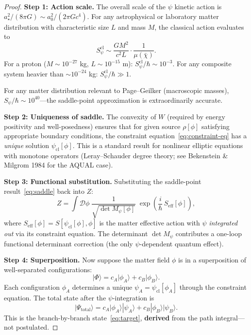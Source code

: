 \documentclass[11pt,a4paper]{article}
\begin{document}
\begin{proof}
\textbf{Step 1: Action scale.}
The overall scale of the $\psi$ kinetic action is
$a_\star^2/(8\pi G) \sim a_0^2/(2\pi G c^4)$. For any astrophysical
or laboratory matter distribution with characteristic size $L$ and mass
$M$, the classical action evaluates to
\begin{equation}
S_\psi^\mathrm{cl} \sim \frac{G M^2}{c^2 L} \cdot \frac{1}{\mu(\bar\chi)}.
\end{equation}
For a proton ($M \sim 10^{-27}$ kg, $L \sim 10^{-15}$ m):
$S_\psi^\mathrm{cl}/\hbar \sim 10^{-3}$. For any composite system
heavier than $\sim 10^{-24}$ kg: $S_\psi^\mathrm{cl}/\hbar \gg 1$.

For any matter distribution relevant to Page--Geilker (macroscopic masses),
$S_\psi/\hbar \sim 10^{40}$---the saddle-point approximation is
extraordinarily accurate.

\textbf{Step 2: Uniqueness of saddle.}
The convexity of $W$ (required by energy positivity and well-posedness)
ensures that for given source $\rho[\phi]$ satisfying appropriate boundary
conditions, the constraint equation~\eqref{eq:constraint-eq} has a
\emph{unique} solution $\psi_\mathrm{cl}[\phi]$. This is a standard
result for nonlinear elliptic equations with monotone operators
(Leray--Schauder degree theory; see Bekenstein \& Milgrom 1984 for the
AQUAL case).

\textbf{Step 3: Functional substitution.}
Substituting the saddle-point result~\eqref{eq:saddle} back into
$Z$:
\begin{equation}
Z = \int\mathcal{D}\phi\;
\frac{1}{\sqrt{\det M_\psi[\phi]}}\;
\exp\!\left(\frac{i}{\hbar}\,S_\mathrm{eff}[\phi]\right),
\end{equation}
where $S_\mathrm{eff}[\phi] = S[\psi_\mathrm{cl}[\phi],\phi]$ is the
matter effective action with $\psi$ \emph{integrated out} via its constraint
equation. The determinant $\det M_\psi$ contributes a one-loop functional
determinant correction (the only $\psi$-dependent quantum effect).

\textbf{Step 4: Superposition.}
Now suppose the matter field $\phi$ is in a superposition of
well-separated configurations:
\begin{equation}
|\Phi\rangle = c_A|\phi_A\rangle + c_B|\phi_B\rangle.
\end{equation}
Each configuration $\phi_A$ determines a unique
$\psi_A = \psi_\mathrm{cl}[\phi_A]$ through the constraint equation.
The total state after the $\psi$-integration is
\begin{equation}\label{eq:result-state}
\boxed{
|\Psi_\mathrm{total}\rangle
= c_A|\phi_A\rangle|\psi_A\rangle + c_B|\phi_B\rangle|\psi_B\rangle.
}
\end{equation}
This is the branch-by-branch state~\eqref{eq:target}, \textbf{derived}
from the path integral---not postulated.
\end{proof}
\end{document}
